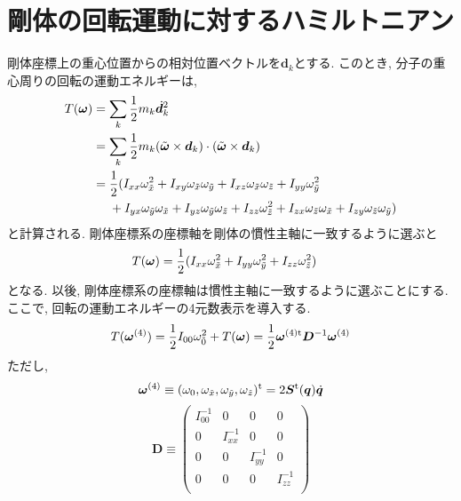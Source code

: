  
\section{剛体の回転運動に対するハミルトニアン}
剛体座標上の重心位置からの相対位置ベクトルを$\bm{d}_{k}$とする. 
このとき, 分子の重心周りの回転の運動エネルギーは, 
\begin{align}
 T(\bm{\omega})
 &=
 \sum_{k} \frac{1}{2} m_{k} \dot{\bm{d}}_{k}^{2}
 \notag
 \\
 &=
 \sum_{k} \frac{1}{2} m_{k}
 (\tilde{\bm{\omega}} \times \bm{d}_{k})
 \cdot (\tilde{\bm{\omega}} \times \bm{d}_{k})
 \notag
 \\
 &=
 \frac{1}{2}
 (
 I_{xx} \omega_{\Tilde{x}}^{2}
+I_{xy} \omega_{\Tilde{x}}\omega_{\Tilde{y}}
+I_{xz} \omega_{\Tilde{x}}\omega_{\Tilde{z}}
+I_{yy} \omega_{\Tilde{y}}^{2}
\notag
\\ &~~~~
+I_{yx} \omega_{\Tilde{y}}\omega_{\Tilde{x}}
+I_{yz} \omega_{\Tilde{y}}\omega_{\Tilde{z}}
+I_{zz} \omega_{\Tilde{z}}^{2}
+I_{zx} \omega_{\Tilde{z}}\omega_{\Tilde{x}}
+I_{zy} \omega_{\Tilde{z}}\omega_{\Tilde{y}}
 )
\label{eq:RigidBodyMD17}
\end{align}
と計算される. 剛体座標系の座標軸を剛体の慣性主軸に一致するように選ぶと
\begin{align}
 T(\bm{\omega})
 &=
 \frac{1}{2}
 (
 I_{xx} \omega_{\Tilde{x}}^{2}
+I_{yy} \omega_{\Tilde{y}}^{2}
+I_{zz} \omega_{\Tilde{z}}^{2}
 )
\label{eq:RigidBodyMD18}
\end{align}
となる. 以後, 剛体座標系の座標軸は慣性主軸に一致するように選ぶことにする. \\
ここで, 回転の運動エネルギーの4元数表示を導入する. 
\begin{equation}
 T(\bm{\omega}^{(4)})
  =
  \frac{1}{2}I_{00}\omega_{\Tilde{0}}^{2} + T(\bm{\omega})
  =
  \frac{1}{2} \bm{\omega}^{(4) \mathrm{t}} \bm{D}^{-1} \bm{\omega}^{(4)}
\label{eq:RigidBodyMD19}
\end{equation}
ただし, 
\begin{equation}
 \bm{\omega}^{(4)}
  \equiv
  (\omega_{0},\omega_{\Tilde{x}},\omega_{\Tilde{y}},\omega_{\Tilde{z}})^{\mathrm{t}}
  =
 2\bm{S}^{\mathrm{t}} (\bm{q}) \dot{\bm{q}}
\label{eq:RigidBodyMD20}
\end{equation}
\begin{equation}
 \bm{D}
 \equiv
 \begin{pmatrix}
  I^{-1}_{00} & 0           & 0           & 0           \\
  0           & I^{-1}_{xx} & 0           & 0           \\
  0           & 0           & I^{-1}_{yy} & 0           \\
  0           & 0           & 0           & I^{-1}_{zz} \\
 \end{pmatrix}
\label{eq:RigidBodyMD21}
\end{equation}
